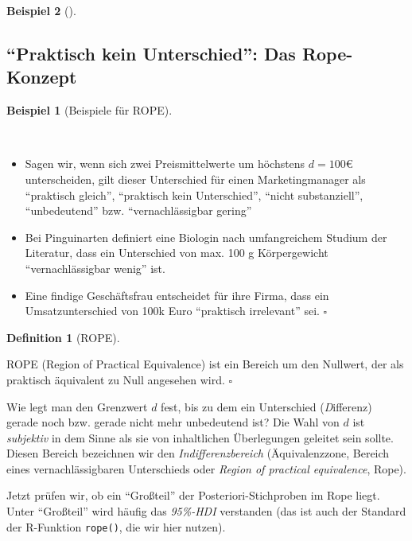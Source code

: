 \documentclass[
  ngerman,
  letterpaper,
  twoside,
  open=any]{scrbook}
\theoremstyle{definition}
\newtheorem{example}{Beispiel}[chapter]
\theoremstyle{plain}
\theoremstyle{definition}
\theoremstyle{definition}
\newtheorem{definition}{Definition}[chapter]
\theoremstyle{remark}
\begin{document}
\begin{example}[]
\subsection{\texorpdfstring{\enquote{Praktisch kein Unterschied}: Das
Rope-Konzept}{``Praktisch kein Unterschied'': Das Rope-Konzept}}\label{praktisch-kein-unterschied-das-rope-konzept}

\begin{example}[Beispiele für
ROPE]\protect\hypertarget{exm-rope}{}\label{exm-rope}

~

\begin{itemize}
\item
  Sagen wir, wenn sich zwei Preismittelwerte um höchstens \(d=100\)€
  unterscheiden, gilt dieser Unterschied für einen Marketingmanager als
  \enquote{praktisch gleich}, \enquote{praktisch kein Unterschied},
  \enquote{nicht substanziell}, \enquote{unbedeutend} bzw.
  \enquote{vernachlässigbar gering}
\item
  Bei Pinguinarten definiert eine Biologin nach umfangreichem Studium
  der Literatur, dass ein Unterschied von max. 100 g Körpergewicht
  \enquote{vernachlässigbar wenig} ist.
\item
  Eine findige Geschäftsfrau entscheidet für ihre Firma, dass ein
  Umsatzunterschied von 100k Euro \enquote{praktisch irrelevant} sei.
  \(\square\)
\end{itemize}

\end{example}

\begin{definition}[ROPE]\protect\hypertarget{def-rope}{}\label{def-rope}

ROPE (Region of Practical Equivalence) ist ein Bereich um den Nullwert,
der als praktisch äquivalent zu Null angesehen wird. \(\square\)

\end{definition}

Wie legt man den Grenzwert \(d\) fest, bis zu dem ein Unterschied
(\emph{D}ifferenz) gerade noch bzw. gerade nicht mehr unbedeutend ist?
Die Wahl von \(d\) ist \emph{subjektiv} in dem Sinne als sie von
inhaltlichen Überlegungen geleitet sein sollte. Diesen Bereich
bezeichnen wir den \emph{Indifferenzbereich} (Äquivalenzzone, Bereich
eines vernachlässigbaren Unterschieds oder \emph{Region of practical
equivalence}, Rope).

Jetzt prüfen wir, ob ein \enquote{Großteil} der Posteriori-Stichproben
im Rope liegt. Unter \enquote{Großteil} wird häufig das \emph{95\%-HDI}
verstanden (das ist auch der Standard der R-Funktion \texttt{rope()},
die wir hier nutzen).


\end{example}
\end{document}
